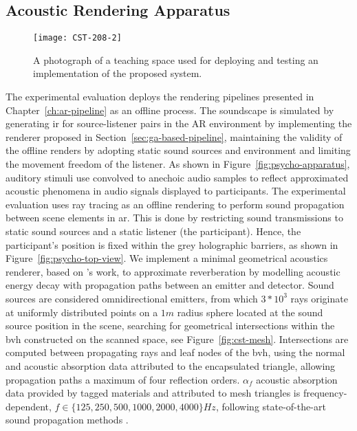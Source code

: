 \subsection{Acoustic Rendering Apparatus}
\begin{figure}[htbp]
    \centering
    \texttt{[image: CST-208-2]}
    \caption[Physical space used for psychoacoustic testing]{A photograph of a teaching space used for deploying and testing an implementation of the proposed system.}\label{fig:cst-208-photograph}
\end{figure}
The experimental evaluation deploys the rendering pipelines presented in Chapter~\ref{ch:ar-pipeline} as an offline process. The soundscape is simulated by generating \acrshort{ir} for source-listener pairs in the AR environment by implementing the renderer proposed in Section~\ref{sec:ga-based-pipeline}, maintaining the validity of the offline renders by adopting static sound sources and environment and limiting the movement freedom of the listener. As shown in Figure~\ref{fig:psycho-apparatus}, auditory stimuli use  convolved to anechoic audio samples to reflect approximated acoustic phenomena in audio signals displayed to participants. The experimental evaluation uses ray tracing as an offline rendering to perform sound propagation between scene elements in \acrshort{ar}. This is done by restricting sound transmissions to static sound sources and a static listener (the participant). Hence, the participant's position is fixed within the grey holographic barriers, as shown in Figure~\ref{fig:psycho-top-view}.
We implement a minimal geometrical acoustics renderer, based on \cite{saviojaGA}'s work, to approximate reverberation by modelling acoustic energy decay with propagation paths between an emitter and detector. Sound sources are considered omnidirectional emitters, from which $3*10^3$ rays originate at uniformly distributed points on a $1m$ radius sphere located at the sound source position in the scene, searching for geometrical intersections within the \acrshort{bvh} constructed on the scanned space, see Figure~\ref{fig:cst-mesh}. Intersections are computed between propagating rays and leaf nodes of the \acrshort{bvh}, using the normal and acoustic absorption data attributed to the encapsulated triangle, allowing propagation paths a maximum of four reflection orders.
$\alpha_f$ acoustic absorption data provided by tagged materials and attributed to mesh triangles is frequency-dependent, $f \in \{ 125, 250, 500, 1000, 2000, 4000 \}Hz$, following state-of-the-art sound propagation methods \citep{schissler2017acoustic}.\par
